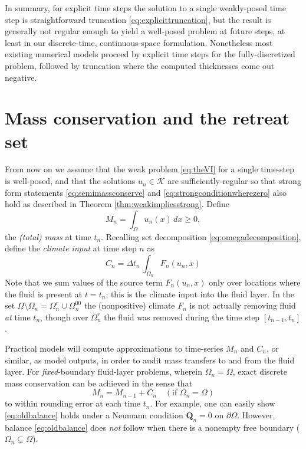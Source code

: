 \documentclass[final,onefignum]{siamart190516}
\newcommand\bQ{\mathbf{Q}}
\begin{document}
In summary, for explicit time steps the solution to a single weakly-posed time step is straightforward truncation \eqref{eq:explicittruncation}, but the result is generally not regular enough to yield a well-posed problem at future steps, at least in our discrete-time, continuous-space formulation.  Nonetheless most existing numerical models \cite[for example]{Winkelmannetal2011} proceed by explicit time steps for the fully-discretized problem, followed by truncation where the computed thicknesses come out negative.


\section{Mass conservation and the retreat set}  \label{sec:timeseries}

From now on we assume that the weak problem \eqref{eq:theVI} for a single time-step is well-posed, and that the solutions $u_n\in \mathcal{K}$ are sufficiently-regular so that strong form statements \eqref{eq:semimassconserve} and \eqref{eq:strongconditionwherezero} also hold as described in Theorem \ref{thm:weakimpliesstrong}.  Define
\begin{equation}
M_n = \int_\Omega u_n(x)\,dx \ge 0, \label{eq:totalmassseries}
\end{equation}
the \emph{(total) mass} at time $t_n$.  Recalling set decomposition \eqref{eq:omegadecomposition}, define the \emph{climate input} at time step $n$ as
\begin{equation}
C_n = \Delta t_n\, \int_{\Omega_n} F_n(u_n,x) \label{eq:climateseries}
\end{equation}
Note that we sum values of the source term $F_n(u_n,x)$ only over locations where the fluid is present at $t=t_n$; this is the climate input into the fluid layer.  In the set $\Omega \setminus \Omega_n = \Omega_n^r \cup \Omega_n^{00}$ the (nonpositive) climate $F_n$ is not actually removing fluid \emph{at} time $t_n$, though over $\Omega_n^r$ the fluid was removed during the time step $[t_{n-1},t_n]$.

Practical models will compute approximations to time-series $M_n$ and $C_n$, or similar, as model outputs, in order to audit mass transfers to and from the fluid layer.  For \emph{fixed}-boundary fluid-layer problems, wherein $\Omega_n=\Omega$, exact discrete mass conservation can be achieved in the sense that
\begin{equation}
M_n = M_{n-1} + C_n \quad (\text{if } \Omega_n = \Omega) \label{eq:oldbalance}
\end{equation}
to within rounding error at each time $t_n$.  For example, one can easily show \eqref{eq:oldbalance} holds under a Neumann condition $\bQ_n=0$ on $\partial \Omega$.  However, balance \eqref{eq:oldbalance} does \emph{not} follow when there is a nonempty free boundary ($\Omega_n \subsetneq \Omega$).
\end{document}
